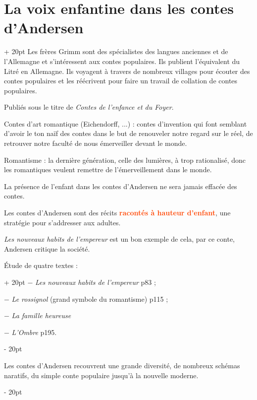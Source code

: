 \documentclass[a4paper, 12pt, twoside]{article}
\newcommand{\strong}[1]{\textcolor{ff4500}{\bf #1}}
\newcommand{\ind}[1][20pt]{\advance\leftskip + #1}
\newcommand{\deind}[1][20pt]{\advance\leftskip - #1}
\newenvironment{indt}[2][20pt]{#2 \par \ind[#1]}{\par \deind} %
\begin{document}
\begin{indt}{\section{La voix enfantine dans les contes d'Andersen}}
        Les frères Grimm sont des spécialistes des langues anciennes et de l'Allemagne et s'intéressent aux contes populaires. Ils publient l'équivalent du Litré en Allemagne. Ils voyagent à travers de nombreux villages pour écouter des contes populaires et les réécrivent pour faire un travail de collation de contes populaires.
        
        Publiés sous le titre de \textit{Contes de l'enfance et du Foyer}.
        
        \vspace{12pt}
        
        Contes d'art romantique (Eichendorff, ...) : contes d'invention qui font semblant d'avoir le ton naïf des contes dans le but de renouveler notre regard sur le réel, de retrouver notre faculté de nous émerveiller devant le monde.
        
        Romantisme : la dernière génération, celle des lumières, à trop rationalisé, donc les romantiques veulent remettre de l'émerveillement dans le monde.
        
        La présence de l'enfant dans les contes d'Andersen ne sera jamais effacée des contes.
        
        Les contes d'Andersen sont des récits \strong{racontés à hauteur d'enfant}, une stratégie pour s'addresser aux adultes.
        
        \textit{Les nouveaux habits de l'empereur} est un bon exemple de cela, par ce conte, Andersen critique la société.
        
        \vspace{12pt}
        
        \begin{indt}{\'Etude de quatre textes :}
            $-$ \textit{Les nouveaux habits de l'empereur} p83 ;
            
            $-$ \textit{Le rossignol} (grand symbole du romantisme) p115 ;
            
            $-$ \textit{La famille heureuse}
            
            $-$ \textit{L'Ombre} p195.
        \end{indt}
        
        
        \vspace{12pt}
        
        Les contes d'Andersen recouvrent une grande diversité, de nombreux schémas naratifs, du simple conte populaire jusqu'à la nouvelle moderne.
        

\end{indt}
\end{document}
